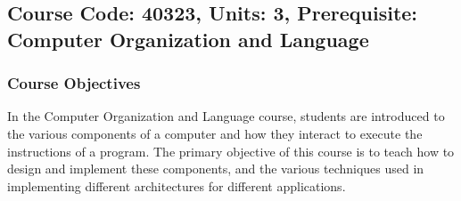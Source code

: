 \documentclass[12pt]{article}
\begin{document}
\subsection*{Course Code: 40323, Units: 3, Prerequisite: Computer Organization and Language}

\subsubsection*{Course Objectives}
In the Computer Organization and Language course, students are introduced to the various components of a computer and how they interact to execute the instructions of a program. The primary objective of this course is to teach how to design and implement these components, and the various techniques used in implementing different architectures for different applications.
\end{document}
